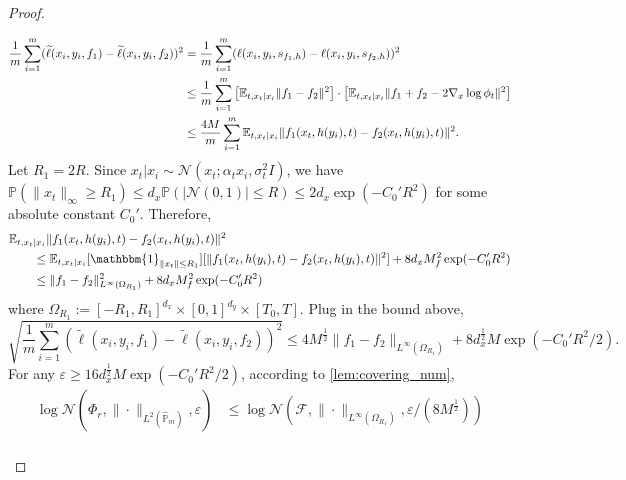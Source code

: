 \documentclass[11pt]{article}
\numberwithin{equation}{section}
\renewcommand{\P}{\mathbb{P}}
\begin{document}
\begin{proof}
\begin{enumerate}[label=\textbf{Step \arabic*.}]
\begin{equation}
                \begin{aligned}
                    \frac{1}{m}\sum_{i=1}^m(\widetilde{\ell}(x_i,y_i,f_1)-\widetilde{\ell}(x_i,y_i,f_2))^2
                    &= \frac{1}{m}\sum_{i=1}^m(\ell(x_i,y_i,s_{f_1,h})-\ell(x_i,y_i,s_{f_2,h}))^2 \\
                    &\leq \frac{1}{m}\sum_{i=1}^m \left[\mathbb{E}_{t,x_t|x_i}\|f_1-f_2\|^2\right]\cdot\left[\mathbb{E}_{t,x_t|x_i}\|f_1+f_2-2\nabla_x\log\phi_t\|^2\right] \\
                    &\leq \frac{4M}{m}\sum_{i=1}^m \mathbb{E}_{t,x_t|x_i}\|f_1(x_t,h(y_i),t)-f_2(x_t,h(y_i),t)\|^2.
                \end{aligned}
            \end{equation}
            Let $R_1=2R$. Since $x_t|x_i\sim\mathcal{N}(x_t;\alpha_tx_i,\sigma_t^2I)$, we have $\P(\|x_t\|_\infty\geq R_1)\leq d_x\P(|\mathcal{N}(0,1)|\leq R)\leq 2d_x\exp(-C_0'R^2)$ for some absolute constant $C_0'$.
            Therefore,
            \begin{equation}
                \begin{aligned}
                    &\E_{t,x_t|x_i}\|f_1(x_t,h(y_i),t)-f_2(x_t,h(y_i),t)\|^2 \\
                    &\qquad \leq \E_{t,x_t|x_i}[\mathbbm{1}_{\|x_t\|\leq R_1}] [\|f_1(x_t,h(y_i),t)-f_2(x_t,h(y_i),t)\|^2] + 8d_xM_f^2\exp(-C_0'R^2) \\
                    &\qquad \leq \|f_1-f_2\|^2_{L^\infty(\Omega_{R_1})} + 8d_xM_f^2\exp(-C_0'R^2)
                \end{aligned}
            \end{equation}
            where $\Omega_{R_1}:=[-R_1,R_1]^{d_x}\times[0,1]^{d_y}\times[T_0,T]$. Plug in the bound above,
            \begin{equation}
                \sqrt{\frac{1}{m}\sum_{i=1}^m(\widetilde{\ell}(x_i,y_i,f_1)-\widetilde{\ell}(x_i,y_i,f_2))^2}
                \leq 4M^{\frac{1}{2}}\|f_1-f_2\|_{L^\infty(\Omega_{R_1})} + 8d_x^{\frac{1}{2}}M\exp(-C_0'R^2/2).
            \end{equation}
            For any $\varepsilon\geq 16d_x^{\frac{1}{2}}M\exp(-C_0'R^2/2)$, according to \ref{lem:covering_num},
            \begin{equation}
                \begin{aligned}
                    \log\mathcal{N}(\Phi_r,\|\cdot\|_{L^2(\widehat{\P}_m)},\varepsilon)
                    &\leq \log\mathcal{N}(\mathcal{F},\|\cdot\|_{L^\infty(\Omega_{R_1})},\varepsilon/(8M^{\frac{1}{2}})) \\

\end{aligned}
\end{equation}
\end{enumerate}
\end{proof}
\end{document}
